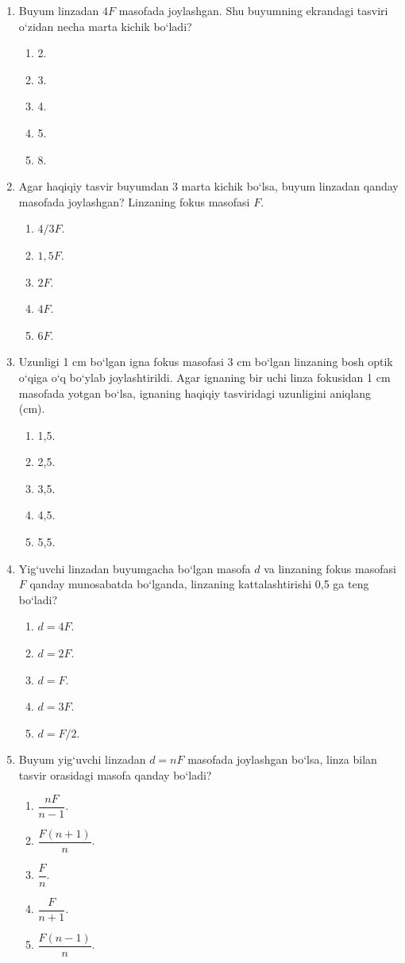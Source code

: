 \begin{enumerate}
\item Buyum linzadan $4F$ masofada joylashgan. Shu buyumning ekrandagi tasviri o‘zidan necha marta kichik bo‘ladi?
\begin{enumerate}[label=\Alph*)]
\item 2.
\item 3.
\item 4.
\item 5.
\item 8.
\end{enumerate}

\item Agar haqiqiy tasvir buyumdan 3 marta kichik bo‘lsa, buyum linzadan qanday masofada joylashgan? Linzaning fokus masofasi $F$.
\begin{enumerate}[label=\Alph*)]
\item $4/3F$.
\item $1{,}5F$.
\item $2F$.
\item $4F$.
\item $6F$.
\end{enumerate}

\item Uzunligi 1 cm bo‘lgan igna fokus masofasi 3 cm bo‘lgan linzaning bosh optik o‘qiga o‘q bo‘ylab joylashtirildi. Agar ignaning bir uchi linza fokusidan 1 cm masofada yotgan bo‘lsa, ignaning haqiqiy tasviridagi uzunligini aniqlang (cm).
\begin{enumerate}[label=\Alph*)]
\item 1,5.
\item 2,5.
\item 3,5.
\item 4,5.
\item 5,5.
\end{enumerate}

\item Yig‘uvchi linzadan buyumgacha bo‘lgan masofa $d$ va linzaning fokus masofasi $F$ qanday munosabatda bo‘lganda, linzaning kattalashtirishi 0,5 ga teng bo‘ladi?
\begin{enumerate}[label=\Alph*)]
\item $d=4F$.
\item $d=2F$.
\item $d=F$.
\item $d=3F$.
\item $d=F/2$.
\end{enumerate}

\item Buyum yig‘uvchi linzadan $d=nF$ masofada joylashgan bo‘lsa, linza bilan tasvir orasidagi masofa qanday bo‘ladi?
\begin{enumerate}[label=\Alph*)]
\item $\dfrac{nF}{n-1}$.
\item $\dfrac{F(n+1)}{n}$.
\item $\dfrac{F}{n}$.
\item $\dfrac{F}{n+1}$.
\item $\dfrac{F(n-1)}{n}$.
\end{enumerate}


\end{enumerate}

